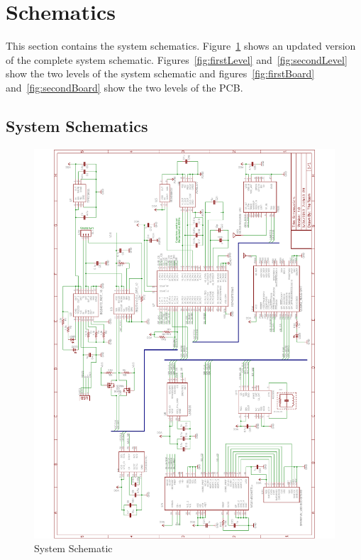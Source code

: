\section{Schematics}

This section contains the system schematics. Figure~\ref{fig:systemSchematics} shows an updated version of the complete system schematic.  Figures~\ref{fig:firstLevel} and~\ref{fig:secondLevel} show the two levels of the system schematic and figures~\ref{fig:firstBoard} and~\ref{fig:secondBoard} show the two levels of the PCB.  

\subsection{System Schematics}
\begin{figure}[H]
\centering
	\includegraphics[width=\textwidth]{img/CompleteSchematics}
	\caption{System Schematic \label{fig:systemSchematics}}
\end{figure}

